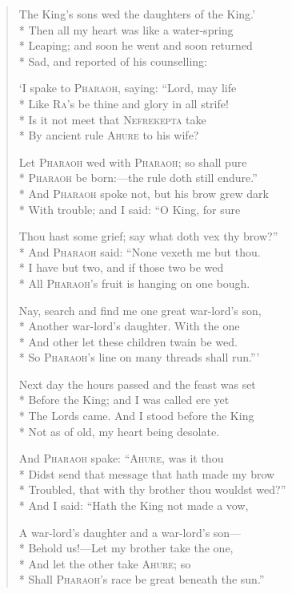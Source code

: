 \documentclass[12pt]{article}
\newcommand{\vin}{\hspace{1em}}
\begin{document}
\begin{verse}
The King's sons wed the daughters of the King.'\\*
Then all my heart was like a water-spring\\*
\vin Leaping; and soon he went and soon returned\\*
Sad, and reported of his counselling:

`I spake to \textsc{Pharaoh}, saying: ``Lord, may life\\*
Like \textsc{Ra}'s be thine and glory in all strife!\\*
\vin Is it not meet that \textsc{Nefrekepta} take\\*
By ancient rule \textsc{Ahure} to his wife?

Let \textsc{Pharaoh} wed with \textsc{Pharaoh}; so shall pure\\*
\textsc{Pharaoh} be born:---the rule doth still endure.''\\*
\vin And \textsc{Pharaoh} spoke not, but his brow grew dark\\*
With trouble; and I said: ``O King, for sure

Thou hast some grief; say what doth vex thy brow?''\\*
And \textsc{Pharaoh} said: ``None vexeth me but thou.\\*
\vin I have but two, and if those two be wed\\*
All \textsc{Pharaoh}'s fruit is hanging on one bough.

Nay, search and find me one great war-lord's son,\\*
Another war-lord's daughter. With the one\\*
\vin And other let these children twain be wed.\\*
So \textsc{Pharaoh}'s line on many threads shall run.''{'}

Next day the hours passed and the feast was set\\*
Before the King; and I was called ere yet\\*
\vin The Lords came. And I stood before the King\\*
Not as of old, my heart being desolate.

And \textsc{Pharaoh} spake: ``\textsc{Ahure}, was it thou\\*
Didst send that message that hath made my brow\\*
\vin Troubled, that with thy brother thou wouldst wed?''\\*
And I said: ``Hath the King not made a vow,

A war-lord's daughter and a war-lord's son---\\*
Behold us!---Let my brother take the one,\\*
\vin And let the other take \textsc{Ahure}; so\\*
Shall \textsc{Pharaoh}'s race be great beneath the sun.''


\end{verse}
\end{document}
